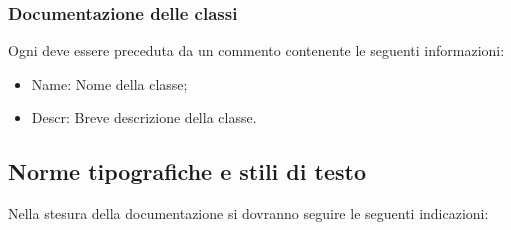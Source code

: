 \subsubsection{Documentazione delle classi}
\label{5.3.3}
Ogni  deve essere preceduta da un commento contenente le seguenti informazioni:
\begin{itemize}
\item Name: Nome della classe;
\item Descr: Breve descrizione della classe.
\end{itemize}

\subsection{Norme tipografiche e stili di testo}
\label{5.4}
Nella stesura della documentazione si dovranno seguire le seguenti indicazioni:
